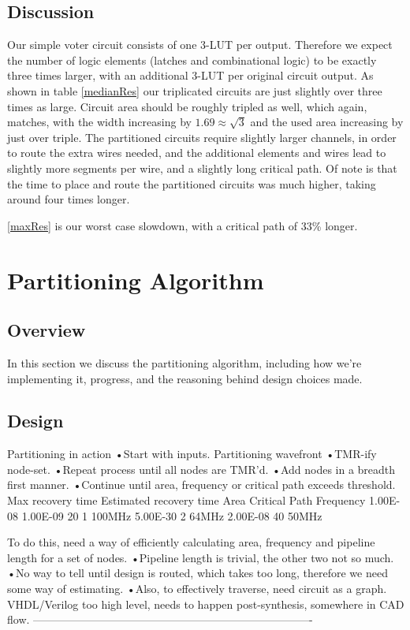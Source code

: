 \documentclass[12pt,drafta4paper,oneside]{memoir} %
\begin{document}
{\section{Discussion}
Our simple voter circuit consists of one 3-\ac{LUT} per output. Therefore we expect the number of logic elements (latches and combinational logic) to be exactly three times larger, with an additional 3-\ac{LUT} per original circuit output. As shown in table \ref{medianRes} our triplicated circuits are just slightly over three times as large. Circuit area should be roughly tripled as well, which again, matches, with the width increasing by $1.69 \approx \sqrt{3}$ and the used area increasing by just over triple. The partitioned circuits require slightly larger channels, in order to route the extra wires needed, and the additional elements and wires lead to slightly more segments per wire, and a slightly long critical path. Of note is that the time to place and route the partitioned circuits was much higher, taking around four times longer.

\ref{maxRes} is our worst case slowdown, with a critical path of 33\% longer.



\chapter{Partitioning Algorithm}
\section{Overview}
In this section we discuss the partitioning algorithm, including how we're implementing it, progress, and the reasoning behind design choices made.
\section{Design}
Partitioning in action
•Start with inputs.
Partitioning wavefront
•TMR-ify node-set.
•Repeat process until all nodes are TMR’d.
•Add nodes in a breadth first manner.
•Continue until area, frequency or critical path exceeds threshold.
Max recovery time
Estimated recovery time
Area
Critical Path
Frequency
1.00E-08
1.00E-09
20
1
100MHz
5.00E-30
2
64MHz
2.00E-08
40
50MHz

To do this, need a way of efficiently calculating area, frequency and pipeline length for a set of nodes.
•Pipeline length is trivial, the other two not so much.
•No way to tell until design is routed, which takes too long, therefore we need some way of estimating.
•Also, to effectively traverse, need circuit as a graph. VHDL/Verilog too high level, needs to happen post-synthesis, somewhere in CAD flow.
----------------------------------------------------------------------------


}
\end{document}
